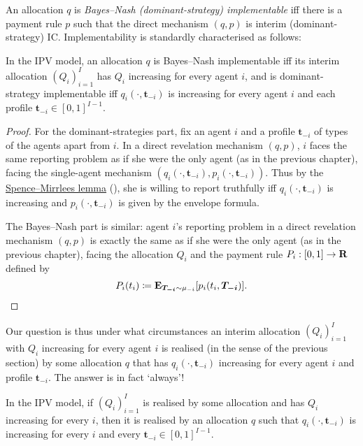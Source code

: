 An allocation $q$ is \emph{Bayes--Nash (dominant-strategy) implementable}
iff there is a payment rule $p$ such that the direct mechanism $(q,p)$ is interim (dominant-strategy) IC.
Implementability is standardly characterised as follows:

\begin{lemma}
	\label{lemma:impl_mon}
	In the IPV model,
	an allocation $q$
	is Bayes--Nash implementable iff its interim allocation $(Q_i)_{i=1}^I$ has $Q_i$ increasing for every agent $i$,
	and is dominant-strategy implementable iff $q_i(\cdot,\boldsymbol{t}_{-i})$ is increasing for every agent $i$ and each profile $\boldsymbol{t}_{-i} \in [0,1]^{I-1}$.
\end{lemma}

\begin{proof}
	For the dominant-strategies part,
	fix an agent $i$
	and a profile $\boldsymbol{t}_{-i}$ of types of the agents apart from $i$.
	In a direct revelation mechanism $(q,p)$,
	$i$ faces the same reporting problem
	as if she were the only agent (as in the previous chapter), facing the single-agent mechanism $\left( q_i\left(\cdot,\boldsymbol{t}_{-i}\right), p_i\left(\cdot,\boldsymbol{t}_{-i}\right) \right)$.
	Thus by the \hyperref[proposition:SM_lemma]{Spence--Mirrlees lemma} (), she is willing to report truthfully iff $q_i\left(\cdot,\boldsymbol{t}_{-i}\right)$ is increasing and $p_i\left(\cdot,\boldsymbol{t}_{-i} \right)$ is given by the envelope formula.

	The Bayes--Nash part is similar:
	agent $i$'s reporting problem in a direct revelation mechanism $(q,p)$
	is exactly the same as if she were the only agent (as in the previous chapter),
	facing the allocation $Q_i$ and the payment rule $P_i : [0,1] \to \mathbf{R}$ defined by
	\begin{equation*}
		P_i(t_i)
		\coloneqq \E_{\boldsymbol{T_{-i}} \sim \mu_{-i}}\left[ p_i(t_i,\boldsymbol{T_{-i}}) \right] . \qedhere
	\end{equation*}
\end{proof}

Our question is thus under what circumstances an interim allocation $(Q_i)_{i=1}^I$ with $Q_i$ increasing for every agent $i$
is realised (in the sense of the previous section) by some allocation $q$ that has $q_i(\cdot,\boldsymbol{t}_{-i})$ increasing for every agent $i$ and profile $\boldsymbol{t}_{-i}$.
The answer is in fact `always'!

\begin{theorem}
	\label{theorem:manellivincent}
	In the IPV model,
	if $(Q_i)_{i=1}^I$ is realised by some allocation
	and has $Q_i$ increasing for every $i$,
	then it is realised by an allocation $q$ such that $q_i(\cdot,\boldsymbol{t}_{-i})$ is increasing for every $i$ and every $\boldsymbol{t}_{-i} \in [0,1]^{I-1}$.
\end{theorem}


